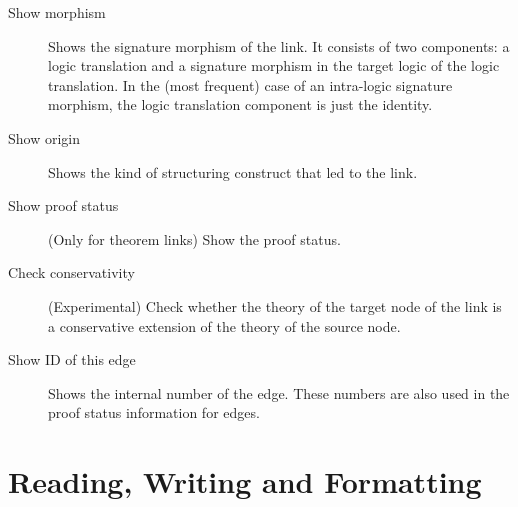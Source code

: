 \documentclass{article}
\begin{document}
\begin{description}
\begin{description}
\item[Show morphism] Shows the signature morphism of the link. It consists
of two components: a logic translation and a signature morphism in the
target logic of the logic translation.
In the (most frequent) case
of an intra-logic signature morphism, the logic translation component is
just the identity.
\item[Show origin] Shows the kind of \CASL structuring construct that
led to the link.
\item[Show proof status] (Only for theorem links) Show the proof status.
\item[Check conservativity] (Experimental) Check whether the  
theory of the target node of the link
is a conservative extension of the theory of the source node.
\item[Show ID of this edge] Shows the internal number of the edge.
These numbers are also used in the proof status information for
edges.
\end{description}
\end{description}

\section{Reading, Writing and Formatting}
\end{document}
